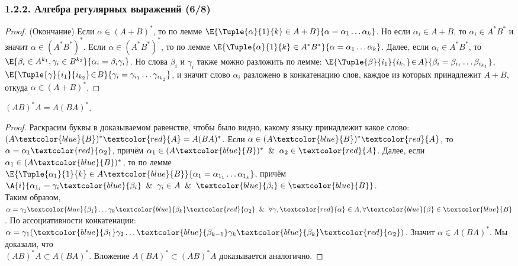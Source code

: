 \begin{frame}
\frametitle{1.2.2. Алгебра регулярных выражений (6/8)}
\begin{proof} (Окончание)
Если $\alpha\in (A+B)^*$, то по лемме 
$\E{\Tuple{\alpha}{1}{k}\in A+B}{\alpha=
\alpha_1\dots\alpha_k}$.
Но если $\alpha_i\in A+B$, 
то $\alpha_i\in A^*B^*$ 
и значит $\alpha\in (A^*B^*)^*$.
Если $\alpha\in (A^*B^*)^*$, то по лемме 
$\E{\Tuple{\alpha}{1}{k}\in A^*B^*}{\alpha=
\alpha_1\dots\alpha_k}$.
Далее, если $\alpha_i \in A^*B^*$,
то $\E{\beta_i\in A^{k_1},
\gamma_i \in B^{k_2}}{\alpha_i = \beta_i \gamma_i}$.
Но слова $\beta_i$ и $\gamma_i$
также можно разложить по лемме:
$\E{\Tuple{\beta}{i_1}{i_{k_1}}\!\in\!A}{\beta_i=\beta_{i_1}\dots\beta_{i_{k_1}}}$,
$\E{\Tuple{\gamma}{i_1}{i_{k_2}}\!\in\!B}{\gamma_i=\gamma_{i_1}\dots\gamma_{i_{k_2}}}$,
 и значит слово $\alpha_i$
 разложено в конкатенацию слов,
 каждое из которых принадлежит $A+B$,
 откуда $\alpha\in (A+B)^*$. 
\end{proof}

\begin{corollary} {\NB{[1]}}
$(AB)^*A = A(BA)^*$.
\end{corollary}

\begin{proof} Раскрасим буквы в доказываемом равенстве, чтобы было видно, какому языку принадлежит какое слово:
$(A\textcolor{blue}{B})^*\textcolor{red}{A}=A(BA)^*$.
Если $\alpha\in(A\textcolor{blue}{B})^*\textcolor{red}{A}$,
то  $\alpha=\alpha_1\textcolor{red}{\alpha_2}$, 
причём $\alpha_1\in(A\textcolor{blue}{B})^*\And \alpha_2\in \textcolor{red}{A}$. 
Далее, если $\alpha_1\in(A\textcolor{blue}{B})^*$, 
то по лемме\\ 
$\E{\Tuple{\alpha_{1}}{1}{k}\in A\textcolor{blue}{B}}{\alpha_{1}=\alpha_{1_1}\ldots\alpha_{1_k}}$, 
причём
 $\A{i}{\alpha_{1_i}=\gamma_i\textcolor{blue}{\beta_i}\And
\gamma_i\in A \And \textcolor{blue}{\beta_i}\in \textcolor{blue}{B}}$.\\ 
Таким образом, $\alpha=\gamma_1\textcolor{blue}{\beta_1}\ldots\gamma_k\textcolor{blue}{\beta_k}\textcolor{red}{\alpha_2}\And\forall\gamma,\textcolor{red}{\alpha}\in A,\forall\textcolor{blue}{\beta} \in \textcolor{blue}{B}$. По ассоциативности конкатенации: $\alpha=\gamma_1(\textcolor{blue}{\beta_1}\gamma_2\ldots\textcolor{blue}{\beta_{k-1}}\gamma_k\textcolor{blue}{\beta_k}\textcolor{red}{\alpha_2})$. Значит $\alpha\in A(BA)^*$. Мы доказали, что \\$(AB)^*A\subset A(BA)^*$. Вложение $A(BA)^*\subset (AB)^*A$ доказывается аналогично.
\end{proof}
\end{frame}

